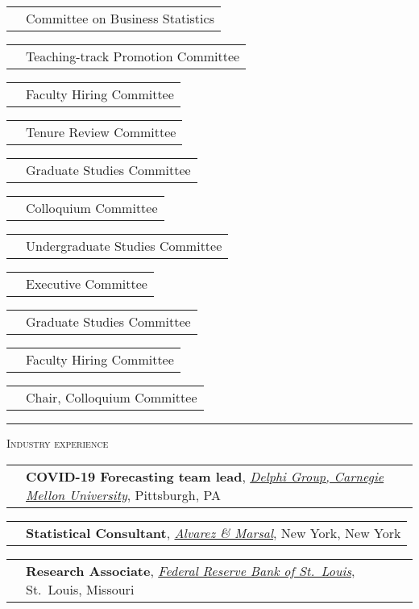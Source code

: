 \documentclass[11pt,letterpaper]{minimal/moderncv}
\makeatletter
\newcommand{\xx}{\textcolor{white}{2022}}
\newcommand{\xxx}{\textcolor{white}{--2022}}
\renewcommand{\cventry}[2]{\cvitem{#1}{\begin{minipage}[t]{\maincolumnwidth}#2\end{minipage}}}
\renewcommand{\section}[1]{  \par\addvspace{15pt}%
  \parbox[t]{\hintscolumnwidth}{\strut\raggedleft\raisebox{4pt}%
  {\rule{\hintscolumnwidth}{2pt}}}%
  \hspace{\separatorcolumnwidth}%
  \textsc{\Large #1}\par\nobreak\addvspace{6pt}%
}
\renewcommand*{\cvitem}[2]{%
  \begin{tabular}{@{}p{\hintscolumnwidth}@{\hspace{\separatorcolumnwidth}}%
    p{\maincolumnwidth}@{}}%
    \raggedleft {#1} &  {#2}%
  \end{tabular}%
}
\makeatother
\begin{document}
\cvitem{2019--2020}{Committee on Business Statistics}

\cvitem{2018--2020}{Teaching-track Promotion Committee}

\cvitem{2018--2020}{Faculty Hiring Committee}

\cvitem{2018--2020}{Tenure Review Committee}

\cvitem{2016--2020}{Graduate Studies Committee}

\cvitem{2012--2018}{Colloquium Committee}

\cvitem{2015--2016}{Undergraduate Studies Committee}

\cvitem{2015--2016}{Executive Committee}

\cvitem{2012--2015}{Graduate Studies Committee}

\cvitem{2012--2015}{Faculty Hiring Committee}

\cvitem{2013--2014}{Chair, Colloquium Committee}

\section{Industry experience}

\cventry{2020--\xx}{\textbf{COVID-19 Forecasting team lead},
  \emph{\href{https://delphi.cmu.edu}{Delphi Group, Carnegie Mellon
      University}}, Pittsburgh, PA}

\cventry{2010\xxx}{\textbf{Statistical Consultant}, \emph{\href{http://www.alvarezandmarsal.com/}{Alvarez \& Marsal}},
  New York, New York}

\cventry{2006--2007}{\textbf{Research Associate}, \emph{\href{http://www.stlouisfed.org/}{Federal Reserve Bank of
    St.\ Louis}}, St.\ Louis, Missouri}

    
\end{document}
